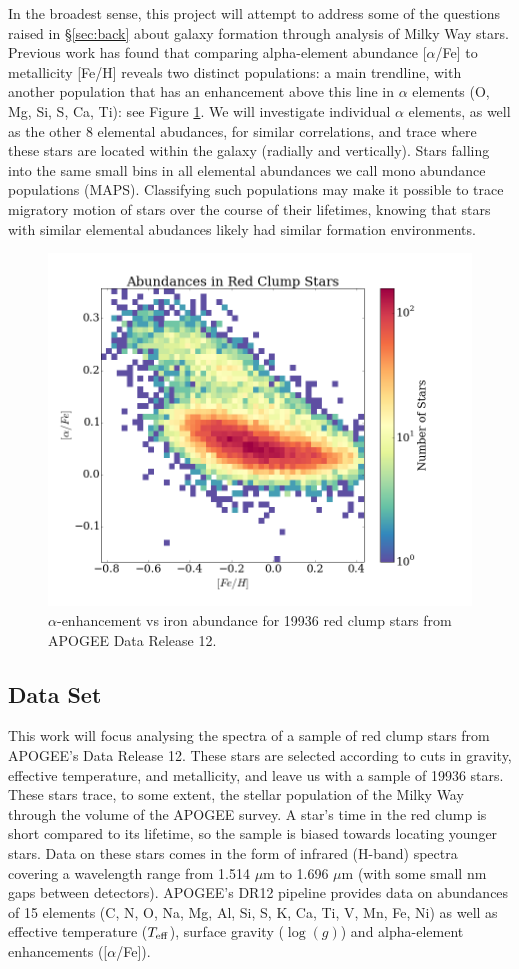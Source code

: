 \documentclass[preprint]{aastex}
\begin{document}
In the broadest sense, this project will attempt to address some of the questions raised in \S\ref{sec:back} about galaxy formation through analysis of Milky Way stars. Previous work \citep{bovy2015} has found that comparing alpha-element abundance [$\alpha$/Fe] to metallicity [Fe/H] reveals two distinct populations: a main trendline, with another population that has an enhancement above this line in $\alpha$ elements (O, Mg, Si, S, Ca, Ti): see Figure \ref{fig:abun}. We will investigate individual $\alpha$ elements, as well as the other 8 elemental abudances, for similar correlations, and trace where these stars are located within the galaxy (radially and vertically). Stars falling into the same small bins in all elemental abundances we call mono abundance populations (MAPS). Classifying such populations may make it possible to trace migratory motion of stars over the course of their lifetimes, knowing that stars with similar elemental abudances likely had similar formation environments.

\begin{figure}%
\centering
\includegraphics[width = 0.8\linewidth]{alpha_vs_fe.png}
\caption{$\alpha$-enhancement vs iron abundance for 19936 red clump stars from APOGEE Data Release 12.}
\label{fig:abun}
\end{figure}

\subsection{Data Set}
\label{sec:data}
This work will focus analysing the spectra of a sample of red clump stars from APOGEE's Data Release 12. These stars are selected according to cuts in gravity, effective temperature, and metallicity, and leave us with a sample of 19936 stars. These stars trace, to some extent, the stellar population of the Milky Way through the volume of the APOGEE survey. A star's time in the red clump is short compared to its lifetime, so the sample is biased towards locating younger stars. Data on these stars comes in the form of infrared (H-band) spectra covering a wavelength range from 1.514 $\mu$m to 1.696 $\mu$m (with some small nm gaps between detectors). APOGEE's DR12 pipeline provides data on abundances of 15 elements (C, N, O, Na, Mg, Al, Si, S, K, Ca, Ti, V, Mn, Fe, Ni) as well as effective temperature ($T_{\rm eff}$), surface gravity ($\log(g)$) and alpha-element enhancements ([$\alpha$/Fe]).
\end{document}
